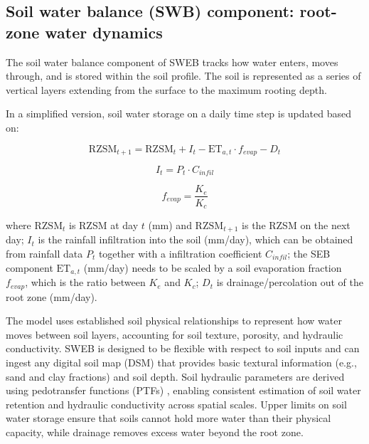 \documentclass[11pt,a4paper]{article}
\begin{document}
\subsection{Soil water balance (SWB) component: root-zone water dynamics}

The soil water balance component of SWEB tracks how water enters, moves through, and is stored within the soil profile. The soil is represented as a series of vertical layers extending from the surface to the maximum rooting depth.

In a simplified version, soil water storage on a daily time step is updated based on:

\begin{equation*}
\mathrm{RZSM}_{t+1} = \mathrm{RZSM}_{t} + I_{t} - \mathrm{ET}_{a,t} \cdot f_{evap} - D_{t}
\tag{3}
\end{equation*}

\begin{equation*}
I_{t} = P_{t} \cdot C_{infil}
\tag{4}
\end{equation*}

\begin{equation*}
f_{evap} = \frac{K_{e}}{K_{c}}
\tag{5}
\end{equation*}

where $\mathrm{RZSM}_{t}$ is RZSM at day $t$ (mm) and $\mathrm{RZSM}_{t+1}$ is the RZSM on the next day; $I_{t}$ is the rainfall infiltration into the soil (mm/day), which can be obtained from rainfall data $P_{t}$ together with a infiltration coefficient $C_{infil}$; the SEB component $\mathrm{ET}_{a,t}$ (mm/day) needs to be scaled by a soil evaporation fraction $f_{evap}$, which is the ratio between $K_{e}$ and $K_{c}$; $D_{t}$ is drainage/percolation out of the root zone (mm/day).

The model uses established soil physical relationships to represent how water moves between soil layers, accounting for soil texture, porosity, and hydraulic conductivity. SWEB is designed to be flexible with respect to soil inputs and can ingest any digital soil map (DSM) that provides basic textural information (e.g., sand and clay fractions) and soil depth. Soil hydraulic parameters are derived using pedotransfer functions (PTFs) \citep{saxton_soil_2006}, enabling consistent estimation of soil water retention and hydraulic conductivity across spatial scales. Upper limits on soil water storage ensure that soils cannot hold more water than their physical capacity, while drainage removes excess water beyond the root zone.
\end{document}
